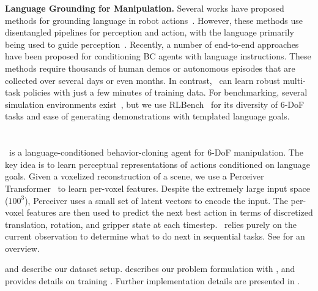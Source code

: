 \textbf{Language Grounding for Manipulation.} Several works have proposed methods for grounding language in robot actions~\citep{Shridhar-RSS-18,matuszek2014learning,bollini2013interpreting,misra2016tell,bisk2016natural,thomason2015learning,interact_picking18,chenJointNetworkGrasp2021, blukis2020few, paxton2019prospection,tellex2011understanding,nguyen2020robot}. However, these methods use disentangled pipelines for perception and action, with the language primarily being used to guide perception~\citep{egl}. 
Recently, a number of end-to-end approaches \citep{ahn2022can,jang2022bc,nair2022learning,mees2022matters,lynch2020grounding} have been proposed for conditioning BC agents with language instructions. These methods require thousands of human demos or autonomous episodes that are collected over several days or even months. In contrast, \model~can learn robust multi-task policies with just a few minutes of training data. For benchmarking, several simulation environments exist~\citep{mees2021calvin,zengTransporterNetworksRearranging2021,yu2020meta}, but we use RLBench~\citep{james2020rlbench} for its diversity of 6-DoF tasks and ease of generating demonstrations with templated language goals. 

\section{\modelfull}

\model~is a language-conditioned behavior-cloning agent for 6-DoF manipulation. The key idea is to learn perceptual representations of actions conditioned on language goals. Given a voxelized reconstruction of a scene, we use a Perceiver Transformer~\citep{jaegle2021perceiver} to learn per-voxel features. Despite the extremely large input space ($100^3$), Perceiver uses a small set of latent vectors to encode the input. The per-voxel features are then used to predict the next best action in terms of discretized translation, rotation, and gripper state at each timestep. \model~relies purely on the current observation to determine what to do next in sequential tasks. 
See  for an overview. 

 and  describe our dataset setup.  describes our problem formulation with \model, and  provides details on training \model. Further implementation details are presented in . 

